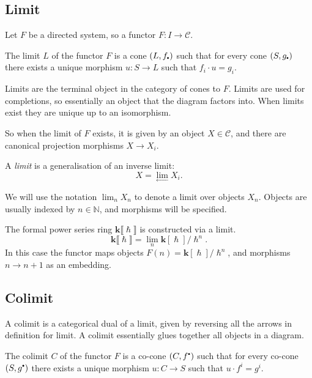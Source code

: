     \subsection{Limit}
    Let \(F\) be a directed system, so a functor \(F : I \rightarrow \mathcal{C}\).
    \begin{defn}[limit]
    \label{defn:limit}
    The limit \(L\) of the functor \(F\) is a cone \( (L,f_{\sbt})\) such that for every cone \( (S,g_{\sbt})\) there exists a unique morphism 
    \( u : S \rightarrow L\) such that \(f_{i} \cdot u = g_{i}\).
    \end{defn}
    
    Limits are the terminal object in the category of cones to \(F\).  Limits are used for completions, so essentially an object that the diagram factors into. When limits exist they are unique up to an isomorphism.
    
    So when the limit of \(F\) exists, it is given by an object \(X\in \mathcal{C}\), and there are canonical projection morphisms \(X \rightarrow X_i\).

    \begin{rem}
    A \emph{limit} is a generalisation of an inverse limit:
    \[ X = \lim_{\longleftarrow} X_i.\]
    \end{rem}

    
    \begin{rem}
    We will use the notation \( \lim_n X_n\) to denote a limit over objects \(X_n\). Objects are usually indexed by \( n\in \mathbb{N}\), and morphisms will be specified. 
    \end{rem}
    
    \begin{ex}
    The formal power series ring \(\mathbf{k}\lBrack \hslash \rBrack\) is constructed via a limit.
    \[ \mathbf{k}\lBrack \hslash \rBrack = \lim_n \mathbf{k}[\hslash] / \hslash^{n}. \]
    In this case the functor maps objects \(F(n) = \mathbf{k}[\hslash] / \hslash^{n}\), and morphisms \(n \rightarrow n+1\) as an embedding.
    \end{ex}
    
    
    
    \subsection{Colimit}
    
    A colimit is a categorical dual of a limit, given by reversing all the arrows in definition for limit. A colimit essentially glues together all objects in a diagram. 
    \begin{defn}[Colimit]
    \label{defn:colimit}
    The colimit \(C\) of the functor \(F\) is a co-cone \( (C,f^{\sbt})\) such that for every co-cone \( (S,g^{\sbt})\) there exists a unique morphism 
    \( u : C \rightarrow S\) such that \( u \cdot f^{i}  = g^{i}\).
    \end{defn}
    

